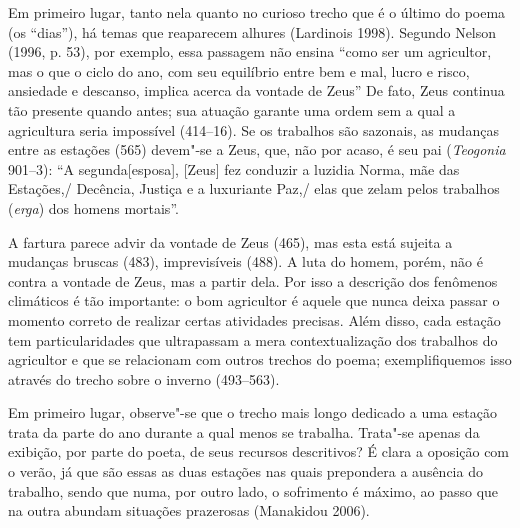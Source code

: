 Em primeiro lugar, tanto nela quanto no curioso trecho que é o último do
poema (os ``dias''), há temas que reaparecem alhures (Lardinois 1998).
Segundo Nelson (1996, p. 53), por exemplo, essa passagem não ensina
``como ser um agricultor, mas o que o ciclo do ano, com seu equilíbrio
entre bem e mal, lucro e risco, ansiedade e descanso, implica acerca da
vontade de Zeus'' De fato, Zeus continua tão presente quando antes; sua
atuação garante uma ordem sem a qual a agricultura seria impossível
(414--16). Se os trabalhos são sazonais, as mudanças entre as estações
(565) devem"-se a Zeus, que, não por acaso, é seu pai (\emph{Teogonia}
901--3): ``A segunda{[}esposa{]}, {[}Zeus{]} fez conduzir a luzidia
Norma, mãe das Estações,/ Decência, Justiça e a luxuriante Paz,/ elas
que zelam pelos trabalhos (\emph{erga}) dos homens mortais''.

A fartura parece advir da vontade de Zeus (465), mas esta está sujeita a
mudanças bruscas (483), imprevisíveis (488). A luta do homem, porém, não
é contra a vontade de Zeus, mas a partir dela. Por isso a descrição dos
fenômenos climáticos é tão importante: o bom agricultor é aquele que
nunca deixa passar o momento correto de realizar certas atividades
precisas. Além disso, cada estação tem particularidades que ultrapassam
a mera contextualização dos trabalhos do agricultor e que se relacionam
com outros trechos do poema; exemplifiquemos isso através do trecho
sobre o inverno (493--563).

Em primeiro lugar, observe"-se que o trecho mais longo dedicado a uma
estação trata da parte do ano durante a qual menos se trabalha. Trata"-se
apenas da exibição, por parte do poeta, de seus recursos descritivos? É
clara a oposição com o verão, já que são essas as duas estações nas
quais prepondera a ausência do trabalho, sendo que numa, por outro lado,
o sofrimento é máximo, ao passo que na outra abundam situações
prazerosas (Manakidou 2006).

